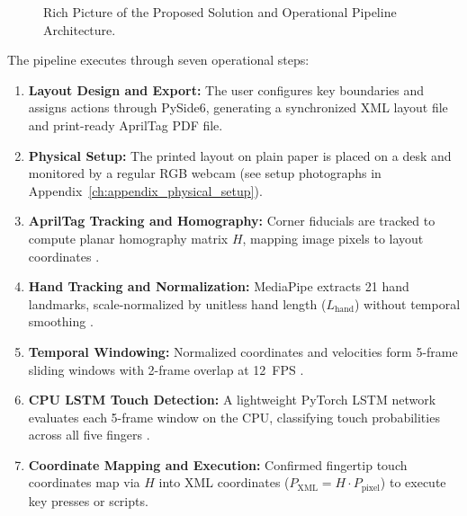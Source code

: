 \begin{figure}[htbp]
{%
}
\caption{Rich Picture of the Proposed Solution and Operational Pipeline Architecture.}
\label{fig:rich_picture_diagram}
\end{figure}

The pipeline executes through seven operational steps:
\begin{enumerate}
    \item \textbf{Layout Design and Export:} The user configures key boundaries and assigns actions through PySide6, generating a synchronized XML layout file and print-ready AprilTag PDF file.
    \item \textbf{Physical Setup:} The printed layout on plain paper is placed on a desk and monitored by a regular RGB webcam (see setup photographs in Appendix~\ref{ch:appendix_physical_setup}).
    \item \textbf{AprilTag Tracking and Homography:} Corner fiducials are tracked to compute planar homography matrix $H$, mapping image pixels to layout coordinates \cite{Wang2016AprilTag2, Kallwies2020Determining}.
    \item \textbf{Hand Tracking and Normalization:} MediaPipe extracts 21 hand landmarks, scale-normalized by unitless hand length ($L_{\text{hand}}$) without temporal smoothing \cite{Zhang2020MediaPipe}.
    \item \textbf{Temporal Windowing:} Normalized coordinates and velocities form 5-frame sliding windows with 2-frame overlap at 12~FPS \cite{Simao2016Unsupervised}.
    \item \textbf{CPU LSTM Touch Detection:} A lightweight PyTorch LSTM network evaluates each 5-frame window on the CPU, classifying touch probabilities across all five fingers \cite{Hochreiter1997LSTM, GilMartin2023Hand}.
    \item \textbf{Coordinate Mapping and Execution:} Confirmed fingertip touch coordinates map via $H$ into XML coordinates ($P_{\text{XML}} = H \cdot P_{\text{pixel}}$) to execute key presses or scripts.
\end{enumerate}

